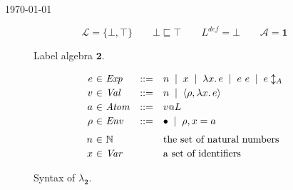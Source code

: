 \documentclass{article}
\makeatletter
\newcommand{\at}{\ensuremath{{\scriptstyle{@}}}}
\theoremstyle{definition}
\makeatother
\begin{document}
\begin{flushright}
  \today
\end{flushright}


\begin{figure}[h]
  \centering
  \[
  \mathcal{L} = \{ \bot, \top \}
  \qquad
  \bot \sqsubseteq \top
  \qquad
  L^{\mathit{def}} = \bot
  \qquad
  \mathcal{A} = \mathbf{1}
  \]
  \caption{Label algebra $\mathbf{2}$.}
  \label{fig:two}
\end{figure}

\begin{figure}[h]
  \centering
  \[
  \begin{array}[t]{r @{\ } c @{\ } l c l}
    e & \in & \mathit{Exp} & ::= &
    n\;\; |\;\;
    x\;\; |\;\;
    \lambda{x}.\, e\;\; |\;\;
    e\ e\;\; |\;\;
    e \updownarrow_{A} %
    \\[0.5ex]
    v & \in & \mathit{Val} & ::= &
    n\;\; |\;\;
    \langle{\rho, \lambda{x}.\, e\rangle}
    \\[0.5ex]
    a & \in & \mathit{Atom} & ::= &
    v \at L
    \\[0.5ex]
    \rho & \in & \mathit{Env} & ::= &
    \bullet\;\; |\;\;
    \rho, x = a
    \\[1.5ex]
    n & \in & \mathbb{N} & &
    \text{the set of natural numbers}
    \\[0.5ex]
    x & \in & \mathit{Var} & &
    \text{a set of identifiers}
  \end{array}
  \]
  \caption{Syntax of $\lambda_{\mathbf{2}}$.}
  \label{fig:syntax}
\end{figure}
\end{document}
